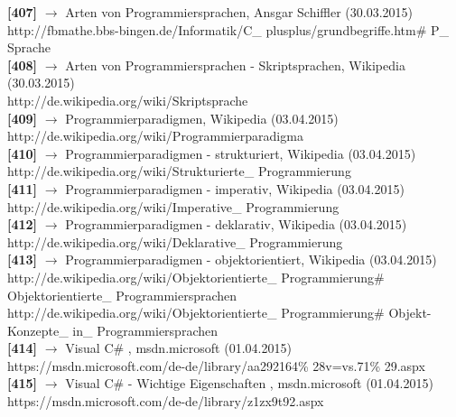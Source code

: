 \documentclass[12pt,a4paper]{report}
\begin{document}
\begin{onehalfspace}
\noindent
\textbf{[407]} $\rightarrow$ Arten von Programmiersprachen, Ansgar Schiffler (30.03.2015)\\
http://fbmathe.bbs-bingen.de/Informatik/C\_ plusplus/grundbegriffe.htm\# P\_ Sprache\\

\noindent
\textbf{[408]} $\rightarrow$ Arten von Programmiersprachen - Skriptsprachen, Wikipedia (30.03.2015)\\
http://de.wikipedia.org/wiki/Skriptsprache\\

\noindent
\textbf{[409]} $\rightarrow$ Programmierparadigmen, Wikipedia (03.04.2015)\\
http://de.wikipedia.org/wiki/Programmierparadigma\\

\noindent
\textbf{[410]} $\rightarrow$ Programmierparadigmen - strukturiert, Wikipedia (03.04.2015)\\
http://de.wikipedia.org/wiki/Strukturierte\_ Programmierung\\

\noindent
\textbf{[411]} $\rightarrow$ Programmierparadigmen - imperativ, Wikipedia (03.04.2015)\\
http://de.wikipedia.org/wiki/Imperative\_ Programmierung\\

\noindent
\textbf{[412]} $\rightarrow$ Programmierparadigmen - deklarativ, Wikipedia (03.04.2015)\\
http://de.wikipedia.org/wiki/Deklarative\_ Programmierung\\

\noindent
\textbf{[413]} $\rightarrow$ Programmierparadigmen - objektorientiert, Wikipedia (03.04.2015)\\
http://de.wikipedia.org/wiki/Objektorientierte\_ Programmierung\# Objektorientierte\_ Programmiersprachen\\
http://de.wikipedia.org/wiki/Objektorientierte\_ Programmierung\# Objekt-Konzepte\_ in\_ Programmiersprachen\\

\noindent
\textbf{[414]} $\rightarrow$ Visual C\# , msdn.microsoft (01.04.2015)\\
https://msdn.microsoft.com/de-de/library/aa292164\% 28v=vs.71\% 29.aspx\\

\noindent
\textbf{[415]} $\rightarrow$ Visual C\# - Wichtige Eigenschaften , msdn.microsoft (01.04.2015)\\
https://msdn.microsoft.com/de-de/library/z1zx9t92.aspx\\


\end{onehalfspace}
\end{document}
